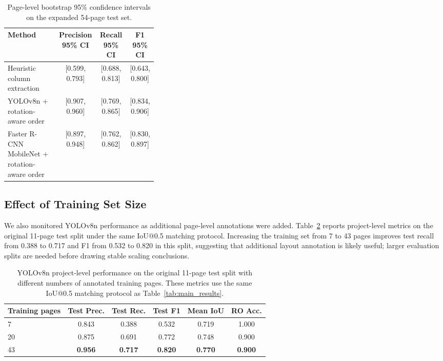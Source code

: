 \documentclass[12pt]{article}
\begin{document}
\begin{table}[t]
\centering
\scriptsize\setlength{\tabcolsep}{3pt}
\caption{Page-level bootstrap 95\% confidence intervals on the expanded 54-page test set.}
\label{tab:bootstrap_ci}
\begin{tabular}{p{0.34\linewidth}ccc}
\toprule
Method & Precision 95\% CI & Recall 95\% CI & F1 95\% CI \\
\midrule
Heuristic column extraction & [0.599, 0.793] & [0.688, 0.813] & [0.643, 0.800] \\
YOLOv8n + rotation-aware order & [0.907, 0.960] & [0.769, 0.865] & [0.834, 0.906] \\
Faster R-CNN MobileNet + rotation-aware order & [0.897, 0.948] & [0.762, 0.862] & [0.830, 0.897] \\
\bottomrule
\end{tabular}
\end{table}


\subsection{Effect of Training Set Size}
We also monitored YOLOv8n performance as additional page-level annotations were added. Table~\ref{tab:train_size} reports project-level metrics on the original 11-page test split under the same IoU@0.5 matching protocol. Increasing the training set from 7 to 43 pages improves test recall from 0.388 to 0.717 and F1 from 0.532 to 0.820 in this split, suggesting that additional layout annotation is likely useful; larger evaluation splits are needed before drawing stable scaling conclusions.

\begin{table}[t]
\centering
\scriptsize\setlength{\tabcolsep}{3pt}
\caption{YOLOv8n project-level performance on the original 11-page test split with different numbers of annotated training pages. These metrics use the same IoU@0.5 matching protocol as Table~\ref{tab:main_results}.}
\label{tab:train_size}
\begin{tabular}{lccccc}
\toprule
Training pages & Test Prec. & Test Rec. & Test F1 & Mean IoU & RO Acc. \\
\midrule
7 & 0.843 & 0.388 & 0.532 & 0.719 & 1.000 \\
20 & 0.875 & 0.691 & 0.772 & 0.748 & 0.900 \\
43 & \textbf{0.956} & \textbf{0.717} & \textbf{0.820} & \textbf{0.770} & \textbf{0.900} \\
\bottomrule
\end{tabular}
\end{table}
\end{document}
